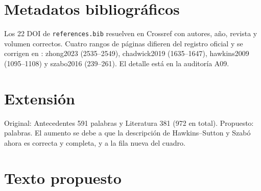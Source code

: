 \section{Metadatos bibliográficos}

Los 22 DOI de \texttt{references.bib} resuelven en Crossref con autores, año, revista y volumen correctos. Cuatro rangos de páginas difieren del registro oficial y se corrigen en : zhong2023 (2535--2549), chadwick2019 (1635--1647), hawkins2009 (1095--1108) y szabo2016 (239--261). El detalle está en la auditoría A09.

\section{Extensión}

Original: Antecedentes 591 palabras y Literatura 381 (972 en total). Propuesto: palabras. El aumento se debe a que la descripción de Hawkins--Sutton y Szabó ahora es correcta y completa, y a la fila nueva del cuadro.

\section{Texto propuesto}

\begin{propuesto}

\end{propuesto}




